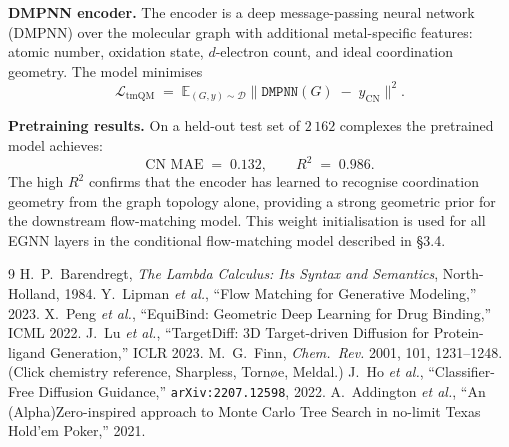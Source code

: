 \documentclass[10pt]{article}
\begin{document}
\medskip\noindent\textbf{DMPNN encoder.}
The encoder is a deep message-passing neural network (DMPNN) over the
molecular graph with additional metal-specific features: atomic number,
oxidation state, $d$-electron count, and ideal coordination geometry.  The
model minimises
\[
  \mathcal{L}_{\text{tmQM}}
  \;=\;
  \mathbb{E}_{(G,y)\sim\mathcal{D}}
  \bigl\|
    \texttt{DMPNN}(G) \;-\; y_{\text{CN}}
  \bigr\|^2 .
\]

\medskip\noindent\textbf{Pretraining results.}
On a held-out test set of $2\,162$ complexes the pretrained model achieves:
\[
  \text{CN MAE} \;=\;0.132,
  \qquad
  R^2 \;=\;0.986 .
\]
The high $R^2$ confirms that the encoder has learned to recognise coordination
geometry from the graph topology alone, providing a strong geometric prior
for the downstream flow-matching model.  This weight initialisation is used
for all EGNN layers in the conditional flow-matching model described in
\S3.4.

\begin{thebibliography}{9}
   H.\ P.\ Barendregt, \emph{The Lambda Calculus:
    Its Syntax and Semantics}, North-Holland, 1984.
   Y.\ Lipman \emph{et al.}, ``Flow Matching for
    Generative Modeling,'' 2023.
   X.\ Peng \emph{et al.}, ``EquiBind: Geometric Deep
    Learning for Drug Binding,'' ICML 2022.
   J.\ Lu \emph{et al.}, ``TargetDiff: 3D
    Target-driven Diffusion for Protein-ligand Generation,'' ICLR 2023.
   M.\ G.\ Finn, \emph{Chem.\ Rev.} 2001, 101,
    1231--1248.  (Click chemistry reference, Sharpless, Torn\o e, Meldal.)
   J.\ Ho \emph{et al.}, ``Classifier-Free Diffusion
    Guidance,'' \texttt{arXiv:2207.12598}, 2022.
   A.\ Addington \emph{et al.}, ``An
    (Alpha)Zero-inspired approach to Monte Carlo Tree Search in no-limit
    Texas Hold'em Poker,'' 2021.
\end{thebibliography}
\end{document}
